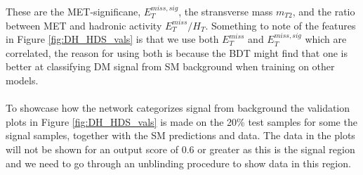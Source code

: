 \documentclass[12pt, a4paper]{book}
\begin{document}
These are the MET-significane, $E_T^{miss,sig}$, the stransverse mass $m_{T2}$, and the ratio between MET and hadronic activity $E_T^{miss}/H_T$. Something to note of the features in Figure \ref{fig:DH_HDS_vals} is that we use both $E_T^{miss}$ and $E_T^{miss,sig}$ which are correlated, the reason for using both is because the BDT 
might find that one is better at classifying DM signal from SM background when training on other models.\\
\\To showcase how the network categorizes signal from background the validation plots in Figure \ref{fig:DH_HDS_vals} is made on the 20\% test samples for some the signal samples, together with the SM predictions and data. The data in the plots will not be shown for an output score of 0.6 or greater as this is the signal region and 
we need to go through an unblinding procedure to show data in this region.\\
\end{document}
